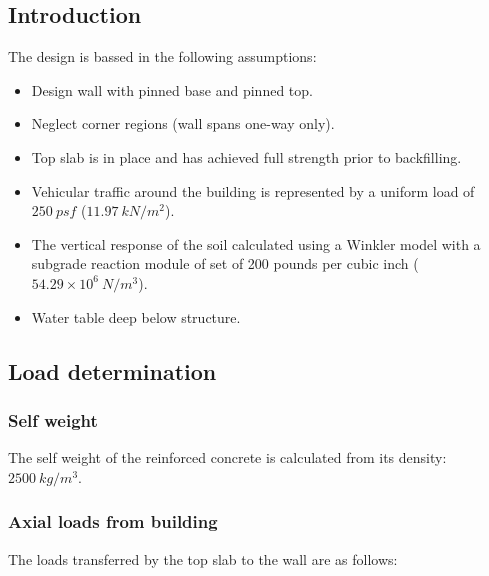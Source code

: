 \subsection{Introduction}

The design is bassed in the following assumptions:

\begin{itemize}
\item Design wall with pinned base and pinned top.
\item Neglect corner regions (wall spans one-way only).
\item Top slab is in place and has achieved full strength prior to backfilling.
\item Vehicular traffic around the building is represented by a uniform load of $250\ psf$ ($11.97\ kN/m^2$).
\item The vertical response of the soil calculated using a Winkler model with a subgrade reaction module of set of 200 pounds per cubic inch ($54.29 \times 10^6\ N/m^3$).
\item Water table deep below structure.
\end{itemize}

\subsection{Load determination}

\subsubsection{Self weight}
The self weight of the reinforced concrete is calculated from its density: $2500\ kg/m^3$.

\subsubsection{Axial loads from building}
The loads transferred by the top slab to the wall are as follows:

